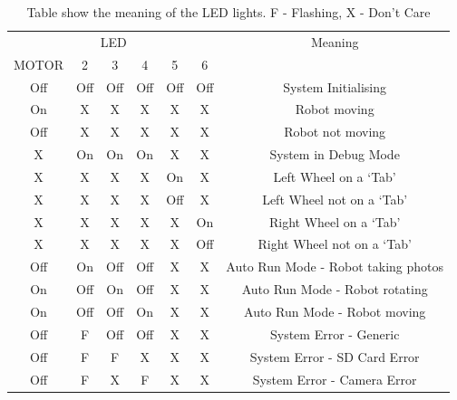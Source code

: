 \begin{table}
\centering
\caption{Table show the meaning of the LED lights. F - Flashing, X - Don't Care}
\label{table:LEDs}
\begin{tabular}{ccccccc}\toprule
\multicolumn{6}{c}{LED} 						& Meaning\\ \cmidrule{1-6}
MOTOR 	& 2		& 3 	& 4 	& 5 	& 6 	& \\ \toprule
Off		& Off	& Off	& Off	& Off	& Off	& System Initialising \\ \midrule
On		& X		& X		& X		& X		& X		& Robot moving\\\midrule
Off		& X		& X		& X		& X		& X		& Robot not moving\\\midrule
X		& On	& On	& On	& X		& X 	& System in Debug Mode \\\midrule
X		& X		& X		& X		& On	& X		& Left Wheel on a `Tab'	\\\midrule
X		& X		& X		& X		& Off	& X		& Left Wheel not on a `Tab'	\\\midrule
X		& X		& X		& X		& X 	& On	& Right Wheel on a `Tab'	\\\midrule
X		& X		& X		& X		& X		& Off	& Right Wheel not on a `Tab'	\\\midrule
Off		& On	& Off	& Off	& X		& X		& Auto Run Mode - Robot taking photos	\\\midrule
On		& Off	& On	& Off	& X		& X		& Auto Run Mode - Robot rotating	\\\midrule
On		& Off	& Off	& On	& X		& X		& Auto Run Mode - Robot moving\\\midrule
Off		& F		& Off	& Off	& X		& X		& System Error - Generic\\\midrule
Off		& F		& F		& X		& X		& X		& System Error - SD Card Error\\\midrule
Off		& F		& X		& F		& X		& X		& System Error - Camera Error\\ \bottomrule
\end{tabular}
\end{table}
